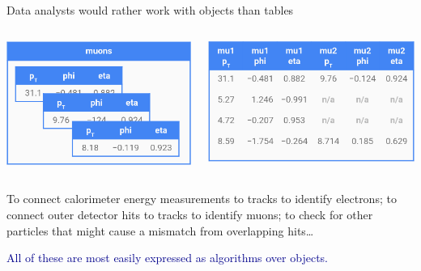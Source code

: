 \documentclass[aspectratio=169]{beamer}
\begin{document}
\begin{frame}{Data analysts would rather work with objects than tables}
\vspace{0.5 cm}
\begin{columns}[b]
\includegraphics[width=\linewidth]{muons-as-objects.png}

\includegraphics[width=\linewidth]{muons-as-a-table.png}
\vspace{0.61 cm}
\end{columns}

\vspace{0.2 cm}
To connect calorimeter energy measurements to tracks to identify electrons; to connect outer detector hits to tracks to identify muons; to check for other particles that might cause a mismatch from overlapping hits\ldots

\vspace{0.2 cm}
\textcolor{darkblue}{All of these are most easily expressed as algorithms over objects.}
\end{frame}
\end{document}
